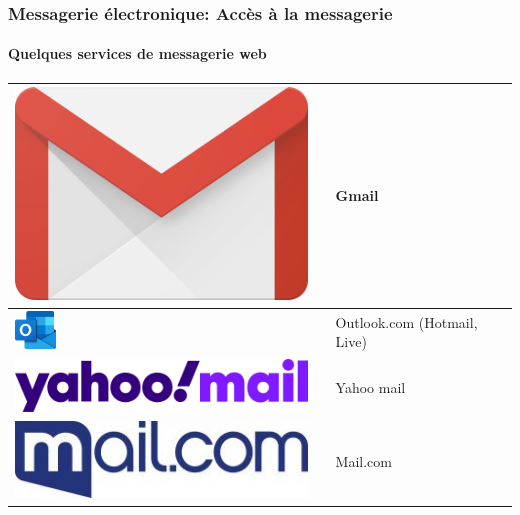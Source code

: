\documentclass[xcolor=table]{beamer}
\begin{document}
\begin{frame}
\frametitle{Messagerie électronique: Accès à la messagerie}
\framesubtitle{Quelques services de messagerie web}

\begin{tabular}{L{.3\textwidth}{1cm}cp{.6\textwidth}}%
	
	\hline
	
	\includegraphics[height=.6cm]{..//img/Bweb02-ri-gmail/gmail-logo.png} &
	&
	Gmail \\
	
	\hline
	
	\includegraphics[height=1cm]{..//img/Bweb02-ri-gmail/outlook-logo.png} &
	& 
	Outlook.com (Hotmail, Live)  \\
	
	\hline
	
	\includegraphics[height=.7cm]{..//img/Bweb02-ri-gmail/yahoomail-logo.png} &
	& 
	Yahoo mail \\
	
	\hline
	
	\includegraphics[height=.7cm]{..//img/Bweb02-ri-gmail/mailcom-logo.jpg} & 
	& 
	Mail.com \\
	
	\hline
	
\end{tabular}

\end{frame}
\end{document}
